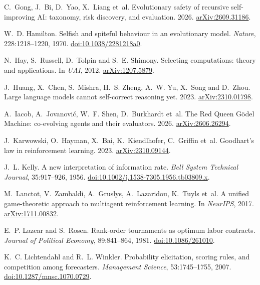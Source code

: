 \documentclass[11pt]{article}
\theoremstyle{definition}
\theoremstyle{remark}
\begin{document}
\begin{thebibliography}{}
C.~Gong, J.~Bi, D.~Yao, X.~Liang et~al. Evolutionary safety of recursive self-improving AI:
taxonomy, risk discovery, and evaluation. 2026.
\href{https://arxiv.org/abs/2609.31186}{arXiv:2609.31186}.

W.~D. Hamilton. Selfish and spiteful behaviour in an evolutionary model. \emph{Nature},
228:1218--1220, 1970. \href{https://doi.org/10.1038/2281218a0}{doi:10.1038/2281218a0}.

N.~Hay, S.~Russell, D.~Tolpin and S.~E. Shimony. Selecting computations: theory and
applications. In \emph{UAI}, 2012. \href{https://arxiv.org/abs/1207.5879}{arXiv:1207.5879}.

J.~Huang, X.~Chen, S.~Mishra, H.~S. Zheng, A.~W. Yu, X.~Song and D.~Zhou. Large language models
cannot self-correct reasoning yet. 2023.
\href{https://arxiv.org/abs/2310.01798}{arXiv:2310.01798}.

A.~Iacob, A.~Jovanovi\'c, W.~F. Shen, D.~Burkhardt et~al. The Red Queen G\"odel Machine:
co-evolving agents and their evaluators. 2026.
\href{https://arxiv.org/abs/2606.26294}{arXiv:2606.26294}.

J.~Karwowski, O.~Hayman, X.~Bai, K.~Kiendlhofer, C.~Griffin et~al. Goodhart's law in
reinforcement learning. 2023. \href{https://arxiv.org/abs/2310.09144}{arXiv:2310.09144}.

J.~L. Kelly. A new interpretation of information rate. \emph{Bell System Technical Journal},
35:917--926, 1956.
\href{https://doi.org/10.1002/j.1538-7305.1956.tb03809.x}{doi:10.1002/j.1538-7305.1956.tb03809.x}.

M.~Lanctot, V.~Zambaldi, A.~Gruslys, A.~Lazaridou, K.~Tuyls et~al. A unified game-theoretic
approach to multiagent reinforcement learning. In \emph{NeurIPS}, 2017.
\href{https://arxiv.org/abs/1711.00832}{arXiv:1711.00832}.

E.~P. Lazear and S.~Rosen. Rank-order tournaments as optimum labor contracts. \emph{Journal of
Political Economy}, 89:841--864, 1981.
\href{https://doi.org/10.1086/261010}{doi:10.1086/261010}.

K.~C. Lichtendahl and R.~L. Winkler. Probability elicitation, scoring rules, and competition
among forecasters. \emph{Management Science}, 53:1745--1755, 2007.
\href{https://doi.org/10.1287/mnsc.1070.0729}{doi:10.1287/mnsc.1070.0729}.


\end{thebibliography}
\end{document}
